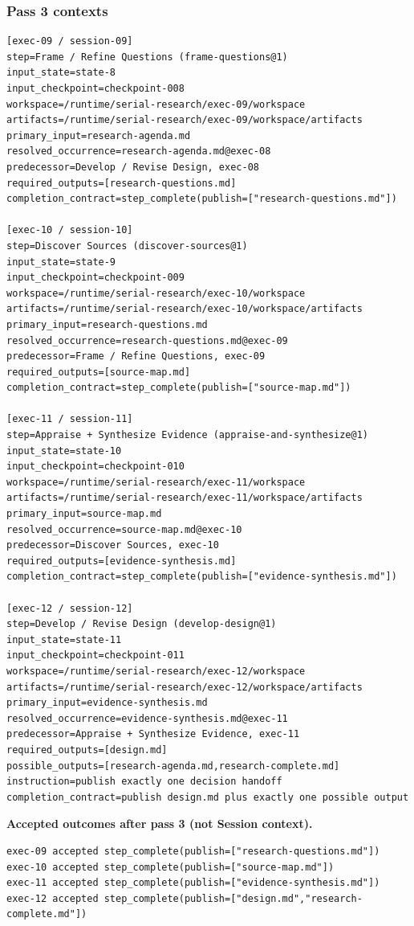 \documentclass[11pt]{article}
\begin{document}
\subsubsection{Pass 3 contexts}

\begin{lstlisting}[style=playbook,basicstyle=\ttfamily\tiny]
[exec-09 / session-09]
step=Frame / Refine Questions (frame-questions@1)
input_state=state-8
input_checkpoint=checkpoint-008
workspace=/runtime/serial-research/exec-09/workspace
artifacts=/runtime/serial-research/exec-09/workspace/artifacts
primary_input=research-agenda.md
resolved_occurrence=research-agenda.md@exec-08
predecessor=Develop / Revise Design, exec-08
required_outputs=[research-questions.md]
completion_contract=step_complete(publish=["research-questions.md"])

[exec-10 / session-10]
step=Discover Sources (discover-sources@1)
input_state=state-9
input_checkpoint=checkpoint-009
workspace=/runtime/serial-research/exec-10/workspace
artifacts=/runtime/serial-research/exec-10/workspace/artifacts
primary_input=research-questions.md
resolved_occurrence=research-questions.md@exec-09
predecessor=Frame / Refine Questions, exec-09
required_outputs=[source-map.md]
completion_contract=step_complete(publish=["source-map.md"])

[exec-11 / session-11]
step=Appraise + Synthesize Evidence (appraise-and-synthesize@1)
input_state=state-10
input_checkpoint=checkpoint-010
workspace=/runtime/serial-research/exec-11/workspace
artifacts=/runtime/serial-research/exec-11/workspace/artifacts
primary_input=source-map.md
resolved_occurrence=source-map.md@exec-10
predecessor=Discover Sources, exec-10
required_outputs=[evidence-synthesis.md]
completion_contract=step_complete(publish=["evidence-synthesis.md"])

[exec-12 / session-12]
step=Develop / Revise Design (develop-design@1)
input_state=state-11
input_checkpoint=checkpoint-011
workspace=/runtime/serial-research/exec-12/workspace
artifacts=/runtime/serial-research/exec-12/workspace/artifacts
primary_input=evidence-synthesis.md
resolved_occurrence=evidence-synthesis.md@exec-11
predecessor=Appraise + Synthesize Evidence, exec-11
required_outputs=[design.md]
possible_outputs=[research-agenda.md,research-complete.md]
instruction=publish exactly one decision handoff
completion_contract=publish design.md plus exactly one possible output
\end{lstlisting}

\noindent\textbf{Accepted outcomes after pass 3 (not Session context).}
\begin{lstlisting}[style=playbook,basicstyle=\ttfamily\scriptsize]
exec-09 accepted step_complete(publish=["research-questions.md"])
exec-10 accepted step_complete(publish=["source-map.md"])
exec-11 accepted step_complete(publish=["evidence-synthesis.md"])
exec-12 accepted step_complete(publish=["design.md","research-complete.md"])
\end{lstlisting}
\end{document}

